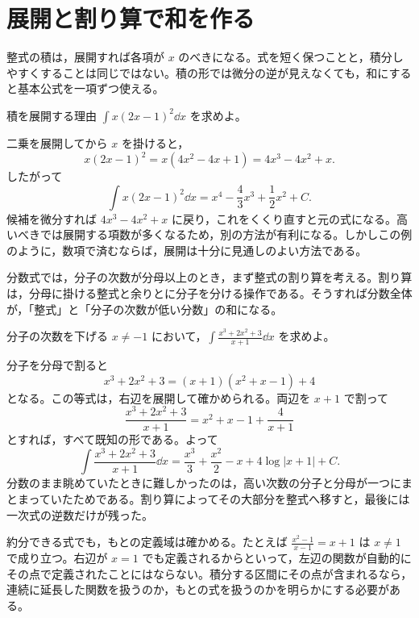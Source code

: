 \section{展開と割り算で和を作る}\label{節:展開と割算}

整式の積は，展開すれば各項が $x$ のべきになる。式を短く保つことと，積分しやすくすることは同じではない。積の形では微分の逆が見えなくても，和にすると基本公式を一項ずつ使える。

\begin{example}{積を展開する理由}
$\int x(2x-1)^2\dd x$ を求めよ。
\end{example}

二乗を展開してから $x$ を掛けると，
\[
 x(2x-1)^2=x(4x^2-4x+1)=4x^3-4x^2+x.
\]
したがって
\[
 \int x(2x-1)^2\dd x
 =x^4-\frac43x^3+\frac12x^2+C.
\]
候補を微分すれば $4x^3-4x^2+x$ に戻り，これをくくり直すと元の式になる。高いべきでは展開する項数が多くなるため，別の方法が有利になる。しかしこの例のように，数項で済むならば，展開は十分に見通しのよい方法である。

分数式では，分子の次数が分母以上のとき，まず整式の割り算を考える。割り算は，分母に掛ける整式と余りとに分子を分ける操作である。そうすれば分数全体が，「整式」と「分子の次数が低い分数」の和になる。

\begin{example}{分子の次数を下げる}
$x\ne-1$ において，$\int\frac{x^3+2x^2+3}{x+1}\dd x$ を求めよ。
\end{example}

分子を分母で割ると
\[
 x^3+2x^2+3=(x+1)(x^2+x-1)+4
\]
となる。この等式は，右辺を展開して確かめられる。両辺を $x+1$ で割って
\[
 \frac{x^3+2x^2+3}{x+1}
 =x^2+x-1+\frac4{x+1}
\]
とすれば，すべて既知の形である。よって
\[
 \int\frac{x^3+2x^2+3}{x+1}\dd x
 =\frac{x^3}{3}+\frac{x^2}{2}-x+4\log|x+1|+C.
\]
分数のまま眺めていたときに難しかったのは，高い次数の分子と分母が一つにまとまっていたためである。割り算によってその大部分を整式へ移すと，最後には一次式の逆数だけが残った。

約分できる式でも，もとの定義域は確かめる。たとえば $\frac{x^2-1}{x-1}=x+1$ は $x\ne1$ で成り立つ。右辺が $x=1$ でも定義されるからといって，左辺の関数が自動的にその点で定義されたことにはならない。積分する区間にその点が含まれるなら，連続に延長した関数を扱うのか，もとの式を扱うのかを明らかにする必要がある。

